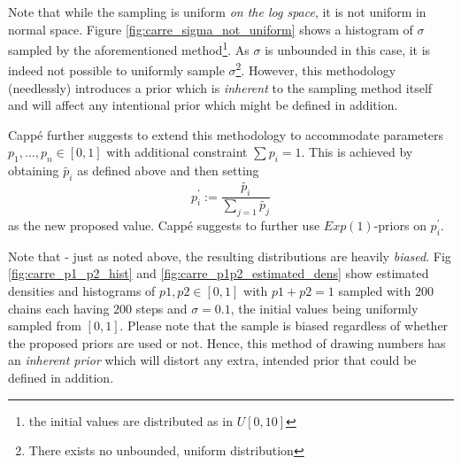 	 Note that while the sampling is uniform \textit{on the log space}, it is not uniform in normal space. Figure \ref{fig:carre_sigma_not_uniform} shows a histogram of $\sigma$ sampled by the aforementioned method\footnote{the initial values are distributed as in $U[0, 10]$}. As $\sigma$ is unbounded in this case, it is indeed not possible to uniformly sample $\sigma$\footnote{There exists no unbounded, uniform distribution}. However, this methodology (needlessly) introduces a prior which is \textit{inherent} to the sampling method itself and will affect any intentional prior which might be defined in addition. 
	 
	 Cappé \cite{cappe2003} further suggests to extend this methodology to accommodate parameters $p_1, \dots, p_n \in [0,1]$ with additional constraint $\sum p_i = 1$. This is achieved by obtaining $\tilde{p_i}$ as defined above and then setting
	 \[
	 	p_i^{\prime} := \frac{\tilde{p_i}}{\sum_{j=1} \tilde{p_j}}
	 \]
	 as the new proposed value. Cappé suggests to further use $Exp(1)$-priors on $p_i^{\prime}$. 
	 
	 Note that - just as noted above, the resulting distributions are heavily \textit{biased}. Fig \ref{fig:carre_p1_p2_hist} and \ref{fig:carre_p1p2_estimated_dens} show estimated densities and histograms of $p1, p2 \in [0,1]$ with $p1 + p2 = 1$ sampled with $200$ chains each having $200$ steps and $\sigma = 0.1$, the initial values being uniformly sampled from $[0, 1]$. Please note that the sample is biased regardless of whether the proposed priors are used or not. Hence, this method of drawing numbers has an \textit{inherent prior} which will distort any extra, intended prior that could be defined in addition. 
	 
	 
 

